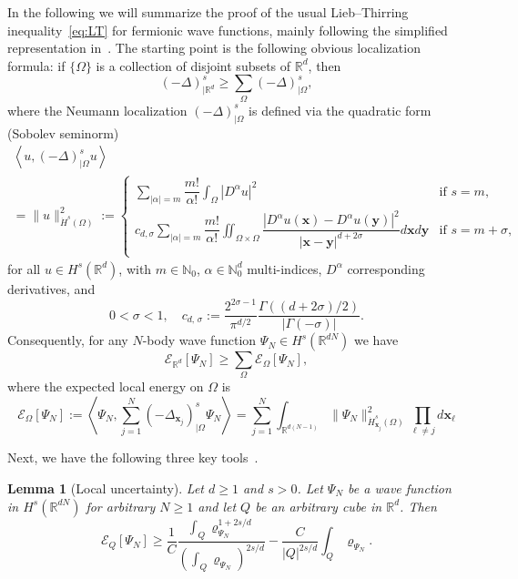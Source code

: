 \documentclass[10pt]{amsart}
\newtheorem{lemm}[theo]{Lemma}\newtheorem{prop}[theo]{Proposition}\newtheorem{coro}[theo]{Corollary}\newtheorem{conj}[theo]{Conjecture}
\theoremstyle{definition}\newtheorem{defi}[theo]{Definition}\newtheorem{rema}[theo]{Remark}\newtheorem{exam}[theo]{Example}\newtheorem{exem}[theo]{Example}\newtheorem{nota}[theo]{Notation}
\newcommand*\N {\mathbb{N}}
\newcommand*\R {\mathbb{R}}
\newcommand\1{{\ensuremath {\mathds 1} }}
\newcommand{\bx}{\mathbf{x}}
\newcommand{\by}{\mathbf{y}}
\newcommand{\cE}{\mathcal{E}}
\begin{document}
In the following we will summarize the proof of the usual Lieb--Thirring inequality~\eqref{eq:LT} for fermionic wave functions, mainly following the simplified representation in~\cite{LunNamPor-16}. The starting point is the following obvious localization formula: if $\{\Omega\}$ is a collection of disjoint subsets of $\R^d$, then
\begin{equation}\label{eq:operator-localization}
(-\Delta)^s_{|\R^d} \ge \sum_{\Omega} (-\Delta)^s_{|\Omega},
\end{equation}
where the Neumann localization $(-\Delta)^s_{|\Omega}$ is defined via the quadratic form (Sobolev seminorm)
\begin{multline*}
\left\langle u, (-\Delta)^s_{|\Omega} u\right\rangle\\
= \|u\|_{\dot{H}^s(\Omega)}^2 := \!
\begin{cases}
\sum\limits_{|\alpha|=m} \dfrac{m!}{\alpha!} \int_{\Omega} \left|D^\alpha u\right|^2 & \text{if~}s=m, \\[0.2cm] c_{d,\sigma}\sum\limits_{|\alpha|=m} \dfrac{m!}{\alpha!} \iint_{\Omega\times \Omega} \dfrac{\left|D^\alpha u (\bx) -D^\alpha u (\by)\right|^2}{\left|\bx-\by\right|^{d+2\sigma}}d\bx d\by & \text{if~} s=m+\sigma, \\
\end{cases}
\end{multline*}
for all $u\in H^s(\R^d)$, with $m \in \N_0$, $\alpha \in \N_0^d$ multi-indices, $D^\alpha$ corresponding derivatives, and
\[
0<\sigma<1, \quad c_{d,\,\sigma} :=\frac{2^{2\sigma-1}}{\pi^{d/2}} \frac{\Gamma((d+2\sigma)/2)}{|\Gamma(-\sigma)|}.
\]
Consequently, for any $N$-body wave function $\Psi_N \in H^s(\R^{dN})$ we have
\begin{equation}\label{eq:localization}
\cE_{\R^d}[\Psi_N] \ge \sum_\Omega {\mathcal E}_\Omega[\Psi_N],
\end{equation}
where the expected local energy on $\Omega$ is
\begin{equation}\label{eq:def-EQ}
\cE_\Omega[\Psi_N] := \left\langle \Psi_N, \sum_{j=1}^N (-\Delta_{\bx_j})^s_{|\Omega} \Psi_N \right\rangle = \sum_{j=1}^N \int_{\R^{d(N-1)} } \| \Psi_N\|^2_{\dot H^s_{\bx_j}(\Omega)} \prod_{\ell \ne j} d \bx_{\ell}
\end{equation}

Next, we have the following three key tools~\cite[Lemmas~8, 11, 12]{LunNamPor-16}.

\begin{lemm}[Local uncertainty]\label{lem:local-uncertainty}
Let $d\ge 1$ and $s>0$. Let $\Psi_N$ be a wave function in $H^s(\R^{dN})$ for arbitrary $N \ge 1$ and let $Q$ be an arbitrary cube in $\R^d$. Then
\begin{equation}\label{eq:local-uncertainty}
\cE_Q[\Psi_N] \ge \frac{1}{C}\frac{\int_Q \varrho_{\Psi_N}^{1+2s/d}}{\left(\int_Q \varrho_{\Psi_N} \right)^{2s/d}} - \frac{C}{|Q|^{2s/d}} \int_Q \varrho_{\Psi_N}.
\end{equation}
\end{lemm}
\end{document}
